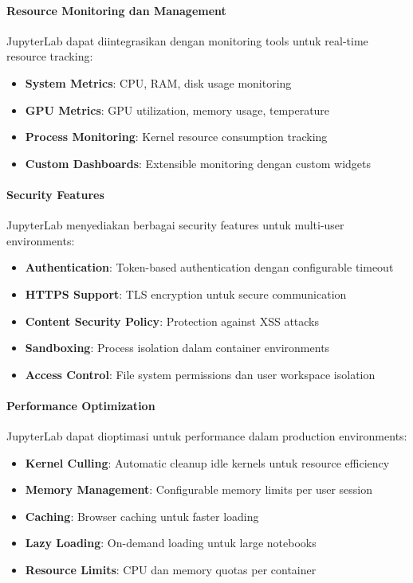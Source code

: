 \paragraph{Resource Monitoring dan Management}

JupyterLab dapat diintegrasikan dengan monitoring tools untuk real-time resource tracking:

\begin{itemize}
\item \textbf{System Metrics}: CPU, RAM, disk usage monitoring
\item \textbf{GPU Metrics}: GPU utilization, memory usage, temperature
\item \textbf{Process Monitoring}: Kernel resource consumption tracking
\item \textbf{Custom Dashboards}: Extensible monitoring dengan custom widgets
\end{itemize}

\paragraph{Security Features}

JupyterLab menyediakan berbagai security features untuk multi-user environments:

\begin{itemize}
\item \textbf{Authentication}: Token-based authentication dengan configurable timeout
\item \textbf{HTTPS Support}: TLS encryption untuk secure communication
\item \textbf{Content Security Policy}: Protection against XSS attacks
\item \textbf{Sandboxing}: Process isolation dalam container environments
\item \textbf{Access Control}: File system permissions dan user workspace isolation
\end{itemize}

\paragraph{Performance Optimization}

JupyterLab dapat dioptimasi untuk performance dalam production environments:

\begin{itemize}
\item \textbf{Kernel Culling}: Automatic cleanup idle kernels untuk resource efficiency
\item \textbf{Memory Management}: Configurable memory limits per user session
\item \textbf{Caching}: Browser caching untuk faster loading
\item \textbf{Lazy Loading}: On-demand loading untuk large notebooks
\item \textbf{Resource Limits}: CPU dan memory quotas per container
\end{itemize}

